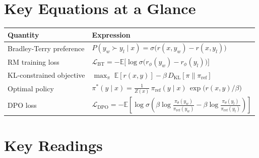 \section*{Key Equations at a Glance}

\begin{center}
\begin{tabularx}{\textwidth}{@{}p{5cm}X@{}}
\toprule
\textbf{Quantity} & \textbf{Expression} \\
\midrule
Bradley-Terry preference & $P(y_w \succ y_l \mid x) = \sigma\!\bigl(r(x, y_w) - r(x, y_l)\bigr)$ \\[4pt]
RM training loss & $\mathcal{L}_{\text{BT}} = -\mathbb{E}\bigl[\log \sigma\!\bigl(r_\phi(y_w) - r_\phi(y_l)\bigr)\bigr]$ \\[4pt]
KL-constrained objective & $\max_{\pi} \;\mathbb{E}[r(x,y)] - \beta\, D_{\text{KL}}[\pi \| \pi_{\text{ref}}]$ \\[4pt]
Optimal policy & $\pi^*(y \mid x) = \frac{1}{Z(x)}\,\pi_{\text{ref}}(y \mid x)\,\exp\!\bigl(r(x,y)/\beta\bigr)$ \\[4pt]
DPO loss & $\mathcal{L}_{\text{DPO}} = -\mathbb{E}\!\left[\log \sigma\!\left(\beta \log \frac{\pi_\theta(y_w)}{\pi_{\text{ref}}(y_w)} - \beta \log \frac{\pi_\theta(y_l)}{\pi_{\text{ref}}(y_l)}\right)\right]$ \\
\bottomrule
\end{tabularx}
\end{center}


\section*{Key Readings}

